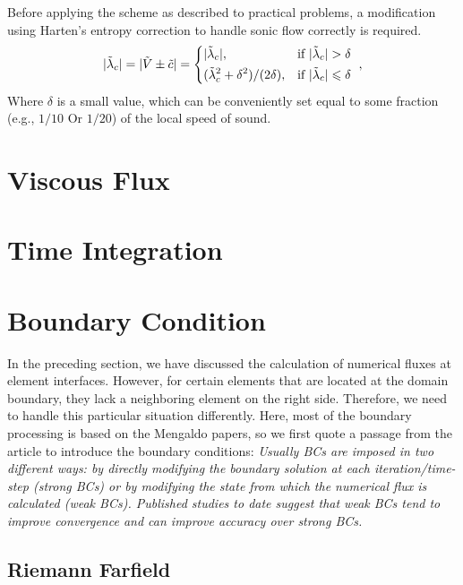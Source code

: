 \documentclass{develop-note}
\begin{document}
Before applying the scheme as described to practical problems, a modification using Harten's entropy correction to handle sonic flow correctly is required.
\begin{equation}
  |\tilde{\lambda}_{c}|=|\tilde{V}\pm\tilde{c}|=\begin{dcases*}
    |\tilde{\lambda}_{c}|, & if $|\tilde{\lambda}_{c}|>\delta$\\
    (\tilde{\lambda}_{c}^{2}+\delta^{2})/(2\delta), & if $|\tilde{\lambda}_{c}|\leqslant\delta$
  \end{dcases*},
\end{equation}
Where $\delta$ is a small value, which can be conveniently set equal to some fraction (e.g., $1/10$ Or $1/20$) of the local speed of sound.

\section{Viscous Flux}


\section{Time Integration}


\section{Boundary Condition}

In the preceding section, we have discussed the calculation of numerical fluxes at element interfaces. However, for certain elements that are located at the domain boundary, they lack a neighboring element on the right side. Therefore, we need to handle this particular situation differently. Here, most of the boundary processing is based on the Mengaldo\cite{mengaldoGuideImplementationBoundary2014} papers, so we first quote a passage from the article to introduce the boundary conditions: \textit{Usually BCs are imposed in two different ways: by directly modifying the boundary solution at each iteration/time-step (strong BCs) or by modifying the state from which the numerical flux is calculated (weak BCs). Published studies to date suggest that weak BCs tend to improve convergence and can improve accuracy over strong BCs.}

\subsection*{Riemann Farfield}
\end{document}
